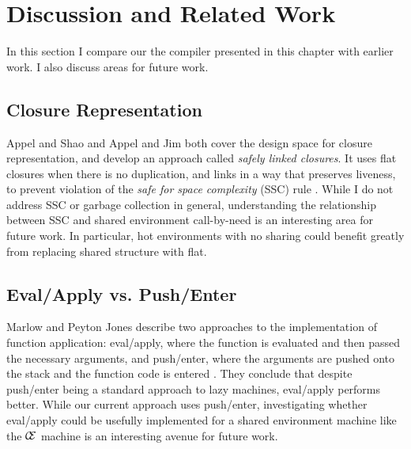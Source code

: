 \section{Discussion and Related Work} \label{sec:disc}

In this section I compare our the compiler presented in this chapter with
earlier work. I also discuss areas for future work.

\subsection{Closure Representation}
Appel and Shao \cite{shao1994space} and Appel and Jim \cite{appel1988optimizing}
both cover the design space for closure representation, and develop an approach
called \emph{safely linked closures}. It uses flat closures when
there is no duplication, and links in a way that preserves liveness, to prevent
violation of the \emph{safe for space complexity} (SSC) rule
\cite{shao1994space}. While I do not address SSC or garbage collection in
general, understanding the relationship between SSC and shared environment
call-by-need is an interesting area for future work. In particular, hot
environments with no sharing could benefit greatly from replacing shared
structure with flat.

\subsection{Eval/Apply vs. Push/Enter}
Marlow and Peyton Jones describe two approaches to the implementation of
function application: eval/apply, where the function is evaluated and then
passed the necessary arguments, and push/enter, where the arguments are pushed
onto the stack and the function code is entered \cite{marlow2006making}. They
conclude that despite push/enter being a standard approach to lazy machines,
eval/apply performs better. While our current approach uses push/enter,
investigating whether eval/apply could be usefully implemented for a shared
environment machine like the $\mathcal{\mathcal{C} \mskip -4mu \mathcal{E}}$
machine is an interesting avenue for future work.

